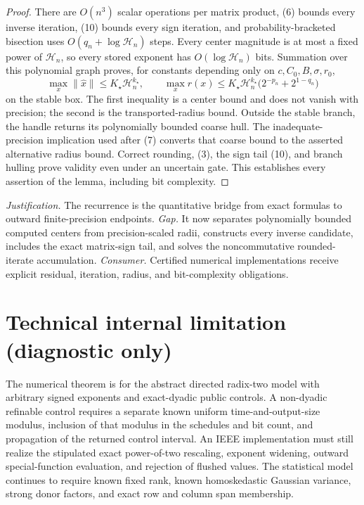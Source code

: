 \documentclass{article}
\begin{document}
\begin{proof}
There are \(O(n^3)\) scalar operations per matrix product, (6) bounds every
inverse iteration, (10) bounds every sign iteration, and probability-bracketed
bisection uses \(O(q_n+\log\mathcal H_n)\) steps.  Every center magnitude is
at most a fixed power of \(\mathcal H_n\), so every stored exponent has
\(O(\log\mathcal H_n)\) bits.  Summation over this polynomial graph proves,
for constants depending only on \(c,C_0,B,\sigma,r_0\),
\[
\max_x\|\widehat x\|\le K_\star\mathcal H_n^{k_\star},
\qquad
\max_x r(x)\le K_\star\mathcal H_n^{k_\star}
\bigl(2^{-p_n}+2^{1-q_n}\bigr)                                      \tag{18}
\]
on the stable box.  The first inequality is a center bound and does not vanish
with precision; the second is the transported-radius bound.  Outside the stable
branch, the handle returns its polynomially bounded coarse hull.  The
inadequate-precision implication used after (7) converts that coarse bound to
the asserted alternative radius bound.  Correct rounding, (3), the sign tail
(10), and branch hulling prove validity even under an uncertain gate.  This
establishes every assertion of the lemma, including bit complexity.
\end{proof}
\par\smallskip\noindent \textit{Justification.} The recurrence is the quantitative bridge from exact formulas to outward finite-precision endpoints. \textit{Gap.} It now separates polynomially bounded computed centers from precision-scaled radii, constructs every inverse candidate, includes the exact matrix-sign tail, and solves the noncommutative rounded-iterate accumulation. \textit{Consumer.} Certified numerical implementations receive explicit residual, iteration, radius, and bit-complexity obligations.

\section*{Technical internal limitation (diagnostic only)}

The numerical theorem is for the abstract directed radix-two model with arbitrary signed exponents and exact-dyadic public controls. A non-dyadic refinable control requires a separate known uniform time-and-output-size modulus, inclusion of that modulus in the schedules and bit count, and propagation of the returned control interval. An IEEE implementation must still realize the stipulated exact power-of-two rescaling, exponent widening, outward special-function evaluation, and rejection of flushed values. The statistical model continues to require known fixed rank, known homoskedastic Gaussian variance, strong donor factors, and exact row and column span membership.
\end{document}
